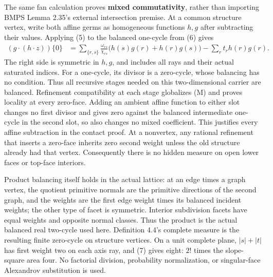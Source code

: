 \documentclass[
  11pt,
]{article}
\begin{document}
The same fan calculation proves \textbf{mixed commutativity}, rather
than importing BMPS Lemma 2.35's external intersection premise. At a
common structure vertex, write both affine germs as homogeneous
functions \(h,g\) after subtracting their values. Applying (5) to the
balanced one-cycle from (6) gives \[
 \begin{split}
 (g\cdot(h\cdot z))\{0\}
  &=\sum_{\{r,s\}}\frac{\omega_{rs}}{\chi_{rs}}
                 \bigl(h(s)g(r)+h(r)g(s)\bigr)
                   -\sum_r t_r h(r)g(r).
 \end{split}                                               \tag{M}
\] The right side is symmetric in \(h,g\), and includes all rays and
their actual saturated indices. For a one-cycle, its divisor is a
zero-cycle, whose balancing has no condition. Thus all recursive stages
needed on this two-dimensional carrier are balanced. Refinement
compatibility at each stage globalizes (M) and proves locality at every
zero-face. Adding an ambient affine function to either slot changes no
first divisor and gives zero against the balanced intermediate one-cycle
in the second slot, so also changes no mixed coefficient. This justifies
every affine subtraction in the contact proof. At a nonvertex, any
rational refinement that inserts a zero-face inherits zero second weight
unless the old structure already had that vertex. Consequently there is
no hidden measure on open lower faces or top-face interiors.

Product balancing itself holds in the actual lattice: at an edge times a
graph vertex, the quotient primitive normals are the primitive
directions of the second graph, and the weights are the first edge
weight times its balanced incident weights; the other type of facet is
symmetric. Interior subdivision facets have equal weights and opposite
normal classes. Thus the product is the actual balanced real two-cycle
used here. Definition 4.4's complete measure is the resulting finite
zero-cycle on structure vertices. On a unit complete plane, \(|s|+|t|\)
has first weight two on each axis ray, and (7) gives eight: \(2!\) times
the slope-square area four. No factorial division, probability
normalization, or singular-face Alexandrov substitution is used.
\end{document}
